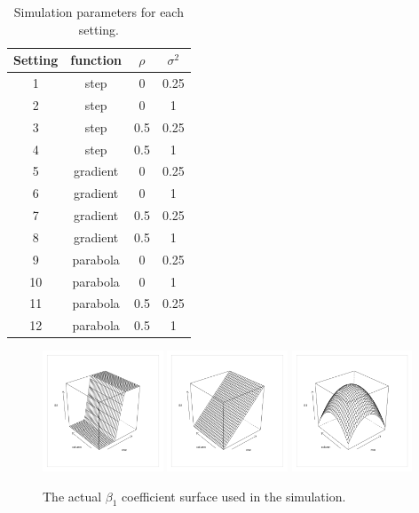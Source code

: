 \documentclass[authoryear, review, 11pt]{elsarticle}
\begin{document}
\begin{table}[h!]
	\begin{center}
	\begin{tabular}{cccc}
		\hline
		Setting & function & $\rho$ & $\sigma^2$ \\ 
		\hline
		1 & step & 0 & 0.25 \\ 
		2 & step & 0 & 1 \\ 
		3 & step & 0.5 & 0.25 \\ 
		4 & step & 0.5 & 1 \\ 
		\hline
		5 & gradient & 0 & 0.25 \\ 
		6 & gradient & 0 & 1 \\ 
		7 & gradient & 0.5 & 0.25 \\ 
		8 & gradient & 0.5 & 1 \\ 
		\hline
		9 & parabola & 0 & 0.25 \\ 
		10 & parabola & 0 & 1 \\ 
		11 & parabola & 0.5 & 0.25 \\ 
		12 & parabola & 0.5 & 1 
	\end{tabular}
	\end{center}
	\caption{Simulation parameters for each setting.\label{table:simulation_settings}}
\end{table}

	\begin{figure}
		\begin{center}
			\includegraphics[width=0.32\textwidth]{../../figures/simulation/step.pdf}
			\includegraphics[width=0.32\textwidth]{../../figures/simulation/gradient.pdf}
			\includegraphics[width=0.32\textwidth]{../../figures/simulation/parabola.pdf}
			\caption{The actual $\beta_1$ coefficient surface used in the simulation.\label{fig:sim-actual}}
		\end{center}
	\end{figure}
	
\end{document}

